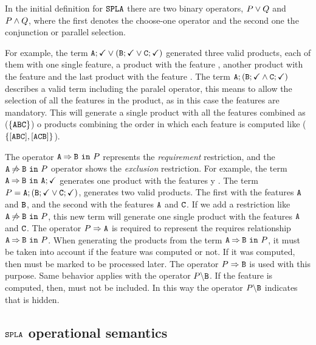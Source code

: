 In the initial definition for $\fodaPA$ there are two binary operators,
$P \choice Q$ and $P\paral Q$, where 
the first denotes the choose-one operator and the second one
the conjunction or parallel selection.

For example, the term
$\feature{A};\checkmark\choice (\feature{B};\checkmark\choice \feature{C};\checkmark)$ 
generated three valid products, each of them with one single feature, a 
product with the feature , another product with the feature  and 
the last product with the feature .
%
The term $\feature{A};(\feature{B};\checkmark\paral \feature{C};\checkmark)$
describes a valid term including the paralel operator, this means
to allow the selection of all the features in the product, as in this case
the features are mandatory.
This will generate a single product with all the
features combined as ($\{\fA\fB\fC\}$) o
products combining the order in which each feature is computed like 
($\{[\fA\fB\fC],[\fA\fC\fB]\}$).

The operator $\require{A}{B}{P}$
represents the \emph{requirement} restriction, and the
$\exclude{A}{B}{P}$ operator shows the \emph{exclusion} restriction.
%
For example, the term $\require{A}{B}{\feature{A};\checkmark}$
generates one product with the features  y .
The term
$P=\feature{A};(\feature{B};\checkmark\choice\feature{C};\checkmark)$,
generates two valid products.
The first with the features $\feature{A}$ and $\feature{B}$,
and the second with the
features  $\feature{A}$ and $\feature{C}$.
If we add a restriction like
$\exclude{A}{B}{P}$, this new term will generate
one single product with the features
$\feature{A}$ and $\feature{C}$. 
%
The operator $\mandatory{A}{P}$ is required to 
represent the requires relationship $\require{A}{B}{P}$.
When generating the products from the term
$\require{A}{B}{P}$, it must be taken into account 
if the feature  was computed or not.
If it was computed, then  must be marked to be processed
later.
The operator $\mandatory{B}{P}$ is used with this purpose.
Same behavior applies with the operator $\forbid{B}{P}$.
If the feature  is computed, then, 
 must not be included.
In this way the operator $\forbid{B}{P}$
indicates that  is hidden.


\subsection{$\fodaPA$ operational semantics}
\label{sec:foda:operational}

